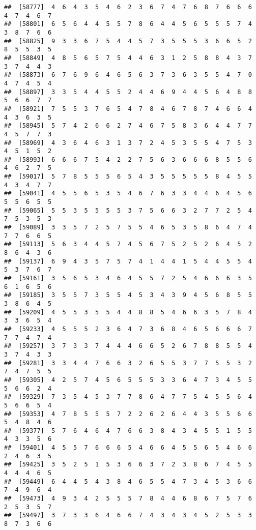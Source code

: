 \documentclass[
]{book}
\begin{document}
\begin{verbatim}
##  [58777]  4  6  4  3  5  4  6  2  3  6  7  4  7  6  8  7  6  6  6  4  7  4  6  7
##  [58801]  6  5  6  4  4  5  5  7  8  6  4  4  5  6  5  5  5  7  4  3  8  7  6  6
##  [58825]  9  3  3  6  7  5  4  4  5  7  3  5  5  5  3  6  6  5  2  8  5  5  3  5
##  [58849]  4  8  5  6  5  7  5  4  4  6  3  1  2  5  8  8  4  3  7  3  7  4  4  3
##  [58873]  6  7  6  9  6  4  6  5  6  3  7  3  6  3  5  5  4  7  0  4  7  4  5  4
##  [58897]  3  3  5  4  4  5  5  2  4  4  6  9  4  4  5  6  4  8  8  5  6  6  7  7
##  [58921]  7  5  5  3  7  6  5  4  7  8  4  6  7  8  7  4  6  6  4  4  3  6  3  5
##  [58945]  5  7  4  2  6  6  2  7  4  6  7  5  8  3  6  4  4  7  7  4  5  7  7  3
##  [58969]  4  3  6  4  6  3  1  3  7  2  4  5  3  5  5  4  7  5  3  4  5  1  5  2
##  [58993]  6  6  6  7  5  4  2  2  7  5  6  3  6  6  6  8  5  5  6  4  6  2  7  5
##  [59017]  5  7  8  5  5  5  6  5  4  3  5  5  5  5  5  8  4  5  5  4  3  4  7  7
##  [59041]  4  5  5  6  5  3  5  4  6  7  6  3  3  4  4  6  4  5  6  5  5  6  5  5
##  [59065]  5  5  3  5  5  5  5  3  7  5  6  6  3  2  7  7  2  5  4  7  5  3  5  3
##  [59089]  3  3  5  7  2  5  7  5  5  4  6  5  3  5  8  6  4  7  4  7  7  6  6  5
##  [59113]  5  6  3  4  4  5  7  4  5  6  7  5  2  5  2  6  4  5  2  8  6  4  3  6
##  [59137]  6  9  4  3  5  7  5  7  4  1  4  4  1  5  4  4  5  5  4  5  3  7  6  7
##  [59161]  3  5  6  5  3  4  6  4  5  5  7  2  5  4  6  6  6  3  5  6  1  6  5  6
##  [59185]  3  5  5  7  3  5  5  4  5  3  4  3  9  4  5  6  8  5  5  3  8  6  4  5
##  [59209]  4  5  5  3  5  5  4  4  8  8  5  4  6  6  3  5  7  8  4  3  3  6  5  4
##  [59233]  4  5  5  5  2  3  6  4  7  3  6  8  4  6  5  6  6  6  7  7  7  4  7  4
##  [59257]  3  7  3  3  7  4  4  4  6  6  5  2  6  7  8  8  5  5  4  3  7  4  3  3
##  [59281]  3  3  4  4  7  6  6  3  2  6  5  5  3  7  7  5  5  3  2  7  4  7  5  5
##  [59305]  4  2  5  7  4  5  6  5  5  5  3  3  6  4  7  3  4  5  5  5  6  6  2  4
##  [59329]  7  3  5  4  5  3  7  7  8  6  4  7  7  5  4  5  5  6  4  5  6  6  5  4
##  [59353]  4  7  8  5  5  5  7  2  2  6  2  6  4  4  3  5  5  6  6  5  4  8  4  6
##  [59377]  5  7  6  4  6  4  7  6  6  3  8  4  3  4  5  5  1  5  5  4  3  3  5  6
##  [59401]  4  5  5  7  6  6  6  5  4  6  6  4  5  5  6  5  4  6  6  2  4  6  3  5
##  [59425]  3  5  2  5  1  5  3  6  6  3  7  2  3  8  6  7  4  5  5  4  4  4  6  5
##  [59449]  6  4  4  5  4  3  8  4  6  5  5  4  7  3  4  5  3  6  6  7  4  9  6  4
##  [59473]  4  9  3  4  2  5  5  5  7  8  4  4  6  8  6  7  5  7  6  2  5  3  5  7
##  [59497]  3  7  3  3  6  4  6  6  7  4  3  4  3  4  5  2  5  3  3  8  7  3  6  6

\end{verbatim}
\end{document}
